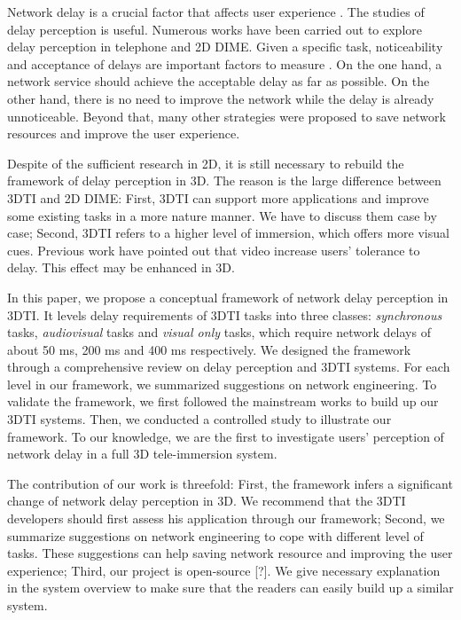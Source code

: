 Network delay is a crucial factor that affects user experience \cite{brunnstrom2013qualinet, schmitt2014asymmetric, schmitt2013qoe, wu2009quality}. The studies of delay perception is useful. Numerous works have been carried out to explore delay perception in telephone and 2D DIME. Given a specific task, noticeability and acceptance of delays are important factors to measure \cite{wu2009quality, schmitt2014influence, geerts2011we, schmitt2014asymmetric}. On the one hand, a network service should achieve the acceptable delay as far as possible. On the other hand, there is no need to improve the network while the delay is already unnoticeable. Beyond that, many other strategies were proposed to save network resources and improve the user experience.

Despite of the sufficient research in 2D, it is still necessary to rebuild the framework of delay perception in 3D. The reason is the large difference between 3DTI and 2D DIME: First, 3DTI can support more applications and improve some existing tasks in a more nature manner. We have to discuss them case by case; Second, 3DTI refers to a higher level of immersion, which offers more visual cues. Previous work \cite{tam2012video} have pointed out that video increase users' tolerance to delay. This effect may be enhanced in 3D.


In this paper, we propose a conceptual framework of network delay perception in 3DTI. It levels delay requirements of 3DTI tasks into three classes: \emph{synchronous} tasks, \emph{audiovisual} tasks and \emph{visual only} tasks, which require network delays of about 50 ms, 200 ms and 400 ms respectively. We designed the framework through a comprehensive review on delay perception and 3DTI systems. For each level in our framework, we summarized suggestions on network engineering. To validate the framework, we first followed the mainstream works to build up our 3DTI systems. Then, we conducted a controlled study to illustrate our framework. To our knowledge, we are the first to investigate users' perception of network delay in a full 3D tele-immersion system.

The contribution of our work is threefold: First, the framework infers a significant change of network delay perception in 3D. We recommend that the 3DTI developers should first assess his application through our framework; Second, we summarize suggestions on network engineering to cope with different level of tasks. These suggestions can help saving network resource and improving the user experience; Third, our project is open-source [?]. We give necessary explanation in the system overview to make sure that the readers can easily build up a similar system.

